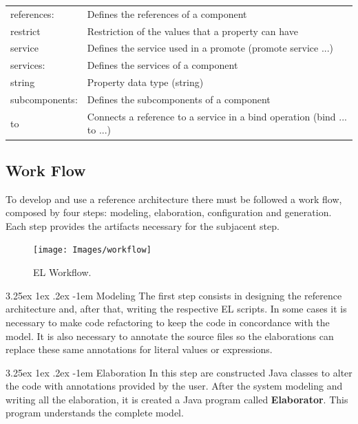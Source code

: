\documentclass{report}
\makeatletter
\renewcommand\paragraph{\@startsection{paragraph}{5}{\z@}%
	{3.25ex \@plus1ex \@minus.2ex}%
	{-1em}%
	{\normalfont\normalsize\bfseries}}
\makeatother
\begin{document}
\begin{table}[H]
\begin{tabular}{l|l}
				references: & Defines the references of a component \\
				
				restrict & Restriction of the values that a property can have \\
				
				service & Defines the service used in a promote (promote service ...)\\
				
				services: & Defines the services of a component \\
				
				string & Property data type (string) \\
				
				subcomponents: & Defines the subcomponents of a component \\
				
				to & Connects a reference to a service in a bind operation (bind ... to ...)\\
				\hline
			\end{tabular}
		\end{table}

		\subsection{Work Flow}
	
		\par To develop and use a reference architecture there must be followed a work flow, composed by four steps: modeling, elaboration, configuration and generation. Each step provides the artifacts necessary for the subjacent step.
		
		\begin{figure} [H]
			\centering
			\texttt{[image: Images/workflow]}
			\caption{EL Workflow.}
			\label{fig:workflow}
		\end{figure}
	
		\paragraph{Modeling} The first step consists in designing the reference architecture and, after that, writing the respective EL scripts. In some cases it is necessary to make code refactoring to keep the code in concordance with the model. It is also necessary to annotate the source files so the elaborations can replace these same annotations for literal values or expressions.

		\paragraph{Elaboration} In this step are constructed Java classes to alter the code with annotations provided by the user. After the system modeling and writing all the elaboration, it is created a Java program called \textbf{Elaborator}. This program understands the complete model.
\end{document}
